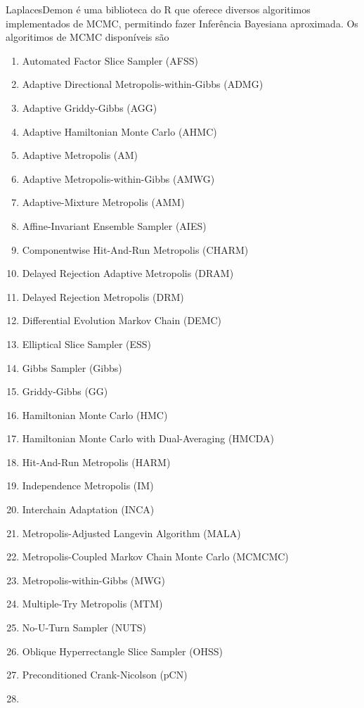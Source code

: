 \documentclass[
]{book}
\providecommand{\tightlist}{%
  \setlength{\itemsep}{0pt}\setlength{\parskip}{0pt}}
\begin{document}
LaplacesDemon é uma biblioteca do R que oferece diversos algoritimos implementados de MCMC, permitindo fazer Inferência Bayesiana aproximada. Os algoritimos de MCMC disponíveis são

\begin{enumerate}
\def\labelenumi{\arabic{enumi}.}
\tightlist
\item
  Automated Factor Slice Sampler (AFSS)
\item
  Adaptive Directional Metropolis-within-Gibbs (ADMG)
\item
  Adaptive Griddy-Gibbs (AGG)
\item
  Adaptive Hamiltonian Monte Carlo (AHMC)
\item
  Adaptive Metropolis (AM)
\item
  Adaptive Metropolis-within-Gibbs (AMWG)
\item
  Adaptive-Mixture Metropolis (AMM)
\item
  Affine-Invariant Ensemble Sampler (AIES)
\item
  Componentwise Hit-And-Run Metropolis (CHARM)
\item
  Delayed Rejection Adaptive Metropolis (DRAM)
\item
  Delayed Rejection Metropolis (DRM)
\item
  Differential Evolution Markov Chain (DEMC)
\item
  Elliptical Slice Sampler (ESS)
\item
  Gibbs Sampler (Gibbs)
\item
  Griddy-Gibbs (GG)
\item
  Hamiltonian Monte Carlo (HMC)
\item
  Hamiltonian Monte Carlo with Dual-Averaging (HMCDA)
\item
  Hit-And-Run Metropolis (HARM)
\item
  Independence Metropolis (IM)
\item
  Interchain Adaptation (INCA)
\item
  Metropolis-Adjusted Langevin Algorithm (MALA)
\item
  Metropolis-Coupled Markov Chain Monte Carlo (MCMCMC)
\item
  Metropolis-within-Gibbs (MWG)
\item
  Multiple-Try Metropolis (MTM)
\item
  No-U-Turn Sampler (NUTS)
\item
  Oblique Hyperrectangle Slice Sampler (OHSS)
\item
  Preconditioned Crank-Nicolson (pCN)
\item

\end{enumerate}
\end{document}
